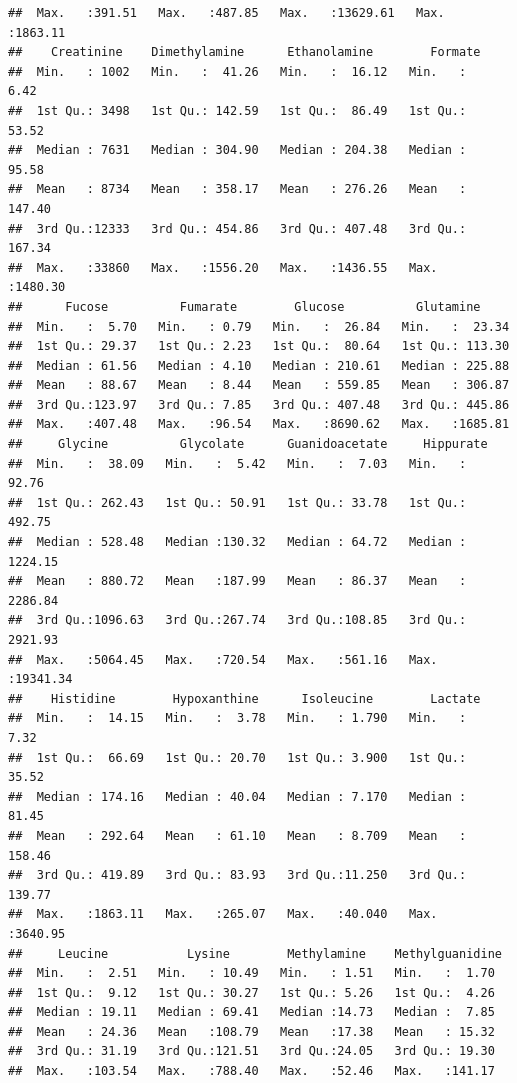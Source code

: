 \documentclass[
]{article}
\begin{document}
\begin{verbatim}
##  Max.   :391.51   Max.   :487.85   Max.   :13629.61   Max.   :1863.11  
##    Creatinine    Dimethylamine      Ethanolamine        Formate       
##  Min.   : 1002   Min.   :  41.26   Min.   :  16.12   Min.   :   6.42  
##  1st Qu.: 3498   1st Qu.: 142.59   1st Qu.:  86.49   1st Qu.:  53.52  
##  Median : 7631   Median : 304.90   Median : 204.38   Median :  95.58  
##  Mean   : 8734   Mean   : 358.17   Mean   : 276.26   Mean   : 147.40  
##  3rd Qu.:12333   3rd Qu.: 454.86   3rd Qu.: 407.48   3rd Qu.: 167.34  
##  Max.   :33860   Max.   :1556.20   Max.   :1436.55   Max.   :1480.30  
##      Fucose          Fumarate        Glucose          Glutamine      
##  Min.   :  5.70   Min.   : 0.79   Min.   :  26.84   Min.   :  23.34  
##  1st Qu.: 29.37   1st Qu.: 2.23   1st Qu.:  80.64   1st Qu.: 113.30  
##  Median : 61.56   Median : 4.10   Median : 210.61   Median : 225.88  
##  Mean   : 88.67   Mean   : 8.44   Mean   : 559.85   Mean   : 306.87  
##  3rd Qu.:123.97   3rd Qu.: 7.85   3rd Qu.: 407.48   3rd Qu.: 445.86  
##  Max.   :407.48   Max.   :96.54   Max.   :8690.62   Max.   :1685.81  
##     Glycine          Glycolate      Guanidoacetate     Hippurate       
##  Min.   :  38.09   Min.   :  5.42   Min.   :  7.03   Min.   :   92.76  
##  1st Qu.: 262.43   1st Qu.: 50.91   1st Qu.: 33.78   1st Qu.:  492.75  
##  Median : 528.48   Median :130.32   Median : 64.72   Median : 1224.15  
##  Mean   : 880.72   Mean   :187.99   Mean   : 86.37   Mean   : 2286.84  
##  3rd Qu.:1096.63   3rd Qu.:267.74   3rd Qu.:108.85   3rd Qu.: 2921.93  
##  Max.   :5064.45   Max.   :720.54   Max.   :561.16   Max.   :19341.34  
##    Histidine        Hypoxanthine      Isoleucine        Lactate       
##  Min.   :  14.15   Min.   :  3.78   Min.   : 1.790   Min.   :   7.32  
##  1st Qu.:  66.69   1st Qu.: 20.70   1st Qu.: 3.900   1st Qu.:  35.52  
##  Median : 174.16   Median : 40.04   Median : 7.170   Median :  81.45  
##  Mean   : 292.64   Mean   : 61.10   Mean   : 8.709   Mean   : 158.46  
##  3rd Qu.: 419.89   3rd Qu.: 83.93   3rd Qu.:11.250   3rd Qu.: 139.77  
##  Max.   :1863.11   Max.   :265.07   Max.   :40.040   Max.   :3640.95  
##     Leucine           Lysine        Methylamine    Methylguanidine 
##  Min.   :  2.51   Min.   : 10.49   Min.   : 1.51   Min.   :  1.70  
##  1st Qu.:  9.12   1st Qu.: 30.27   1st Qu.: 5.26   1st Qu.:  4.26  
##  Median : 19.11   Median : 69.41   Median :14.73   Median :  7.85  
##  Mean   : 24.36   Mean   :108.79   Mean   :17.38   Mean   : 15.32  
##  3rd Qu.: 31.19   3rd Qu.:121.51   3rd Qu.:24.05   3rd Qu.: 19.30  
##  Max.   :103.54   Max.   :788.40   Max.   :52.46   Max.   :141.17  

\end{verbatim}
\end{document}
